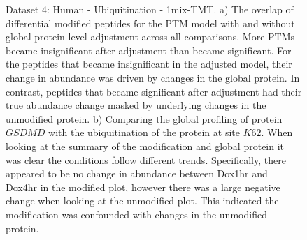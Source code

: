 \documentclass[mcp]{article}
\numberwithin{table}{section}
\begin{document}
\begin{figure}[ht]
\caption{Dataset 4: Human - Ubiquitination - 1mix-TMT. a) The overlap of differential modified peptides for the PTM model with and without global protein level adjustment across all comparisons. More PTMs became insignificant after adjustment than became significant. For the peptides that became insignificant in the adjusted model, their change in abundance was driven by changes in the global protein. In contrast, peptides that became significant after adjustment had their true abundance change masked by underlying changes in the unmodified protein. b) Comparing the global profiling of protein $GSDMD$ with the ubiquitination of the protein at site $K62$. When looking at the summary of the modification and global protein it was clear the conditions follow different trends. Specifically, there appeared to be no change in abundance between Dox1hr and Dox4hr in the modified plot, however there was a large negative change when looking at the unmodified plot. This indicated the modification was confounded with changes in the unmodified protein.}
\label{fig:data4_plots}
\end{figure}
\end{document}
